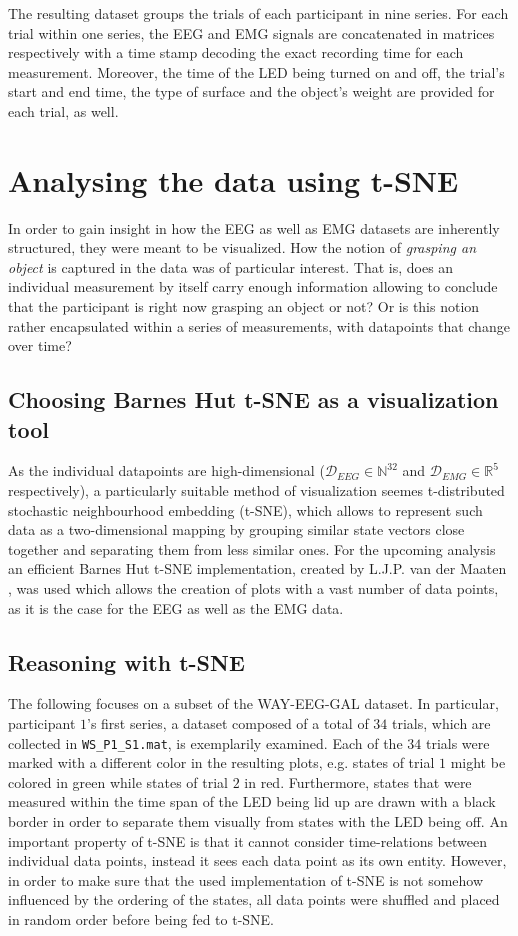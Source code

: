 \documentclass{article} %
\begin{document}
The resulting dataset groups the trials of each participant in nine series. For each trial within one series, the EEG and EMG signals are concatenated in matrices respectively with a time stamp decoding the exact recording time for each measurement. Moreover, the time of the LED being turned on and off, the trial's start and end time, the type of surface and the object's weight are provided for each trial, as well. \cite{nature}




\section{Analysing the data using t-SNE}
\label{sec:tsne}
In order to gain insight in how the EEG as well as EMG datasets are inherently structured, they were meant to be visualized. How the notion of \emph{grasping an object} is captured in the data was of particular interest. That is, does an individual measurement by itself carry enough information allowing to conclude that the participant is right now grasping an object or not? Or is this notion rather encapsulated within a series of measurements, with datapoints that change over time?

\subsection{Choosing Barnes Hut t-SNE as a visualization tool}
As the individual datapoints are high-dimensional ($\mathcal{D}_{EEG} \in \mathbb{N}^{32}$ and $\mathcal{D}_{EMG} \in \mathbb{R}^5$ respectively), a particularly suitable method of visualization seemes t-distributed stochastic neighbourhood embedding (t-SNE), which allows to represent such data as a two-dimensional mapping by grouping similar state vectors close together and separating them from less similar ones. For the upcoming analysis an efficient Barnes Hut t-SNE implementation, created by L.J.P. van der Maaten \cite{tsne}, was used which allows the creation of plots with a vast number of data points, as it is the case for the EEG as well as the EMG data.

\subsection{Reasoning with t-SNE}
The following focuses on a subset of the WAY-EEG-GAL dataset. In particular, participant $1$'s first series, a dataset composed of a total of $34$ trials, which are collected in \verb|WS_P1_S1.mat|, is exemplarily examined. Each of the $34$ trials were marked with a different color in the resulting plots, e.g. states of trial $1$ might be colored in green while states of trial $2$ in red. Furthermore, states that were measured within the time span of the LED being lid up are drawn with a black border in order to separate them visually from states with the LED being off.
An important property of t-SNE is that it cannot consider time-relations between individual data points, instead it sees each data point as its own entity. However, in order to make sure that the used implementation of t-SNE is not somehow influenced by the ordering of the states, all data points were shuffled and placed in random order before being fed to t-SNE.
\end{document}
